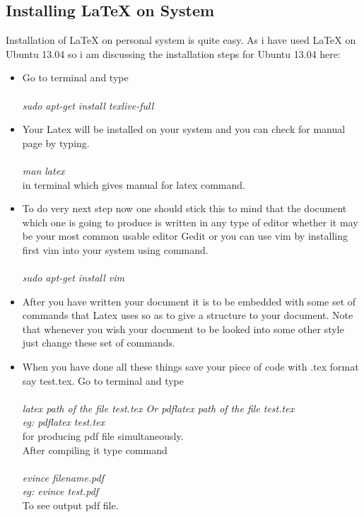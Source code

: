 \subsection{Installing \LaTeX{} on System}
Installation of \LaTeX{} on personal system is quite easy. As i have used \LaTeX{} on Ubuntu 13.04 so i am discussing the installation steps for Ubuntu 13.04 here:
\begin{itemize}
\item Go to terminal and type\\\\
\textit{sudo apt-get install texlive-full}
\item Your Latex will be installed on your system and you can check for manual page by typing.\\\\
\textit{man latex}\\

in terminal which gives manual for latex command.
\item To do very next step now one should stick this to mind that the document which one is going to produce is written in any type of editor whether it may be your most common usable editor Gedit or you can use vim by installing first vim into your system using command.\\\\
\textit{sudo apt-get install vim}
\item After you have written your document it is to be embedded with some set of commands that Latex uses so as to give a structure to your document. Note that whenever you wish your document to be looked into some other style just change these set of commands.
\item When you have done all these things save your piece of code with .tex format say test.tex. Go to terminal and type\\\\
\textit{latex path of the file test.tex Or pdflatex path of the file test.tex\\ eg: pdflatex test.tex}\\
for producing pdf file simultaneously.\\
After compiling it type command\\\\
\textit{evince filename.pdf\\ eg: evince test.pdf}\\
To see output pdf file. 
\end{itemize}


